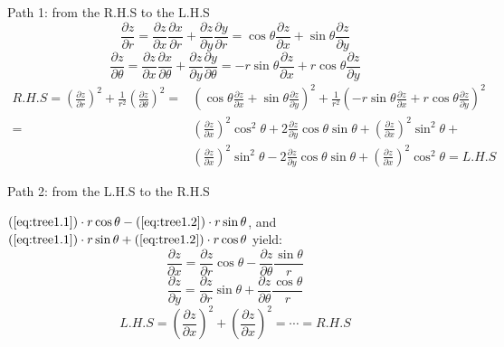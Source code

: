 Path 1: from the R.H.S to the L.H.S
\begin{equation}
\frac{\partial z}{\partial r}=\frac{\partial z}{\partial x}\frac{\partial x}{\partial r}+\frac{\partial z}{\partial y}\frac{\partial y}{\partial r}=\cos\theta \frac{\partial z}{\partial x}+\sin\theta \frac{\partial z}{\partial y}
\label{eq:tree1.1}
\end{equation}
\begin{equation}
\frac{\partial z}{\partial \theta}=\frac{\partial z}{\partial x}\frac{\partial x}{\partial \theta}+\frac{\partial z}{\partial y}\frac{\partial y}{\partial \theta}=-r\sin\theta \frac{\partial z}{\partial x}+r\cos\theta \frac{\partial z}{\partial y}
\label{eq:tree1.2}
\end{equation}
\begin{align}
R.H.S=(\frac{\partial z}{\partial r})^2+\frac{1}{r^2}(\frac{\partial z}{\partial \theta })^2
=&(\cos\theta \frac{\partial z}{\partial x}+\sin\theta \frac{\partial z}{\partial y})^2+\frac{1}{r^2}(-r\sin\theta \frac{\partial z}{\partial x}+r\cos\theta \frac{\partial z}{\partial y})^2	\\
\nonumber =&(\frac{\partial z}{\partial x})^2\cos^2\theta+2\frac{\partial z}{\partial y}\cos\theta \sin\theta +(\frac{\partial z}{\partial x})^2\sin^2\theta +\\
\nonumber &(\frac{\partial z}{\partial x})^2\sin^2\theta-2\frac{\partial z}{\partial y}\cos\theta \sin\theta +(\frac{\partial z}{\partial x})^2\cos^2\theta 
=L.H.S
\end{align}
\begin{center}
\end{center}

Path 2: from the L.H.S to the R.H.S

$(\ref{eq:tree1.1})\cdot r\cos \theta - (\ref{eq:tree1.2})\cdot r\sin \theta$, and
$(\ref{eq:tree1.1})\cdot r\sin \theta + (\ref{eq:tree1.2})\cdot r\cos \theta$
yield:
\begin{equation}
\frac{\partial z}{\partial x}=\frac{\partial z}{\partial r}\cos\theta -\frac{\partial z}{\partial \theta}\frac{\sin\theta}{r}
\end{equation}
\begin{equation}
\frac{\partial z}{\partial y}=\frac{\partial z}{\partial r}\sin\theta +\frac{\partial z}{\partial \theta}\frac{\cos\theta}{r}
\end{equation}
\[
L.H.S=(\frac{\partial z}{\partial x})^2+(\frac{\partial z}{\partial x})^2=\cdots=R.H.S
\]

